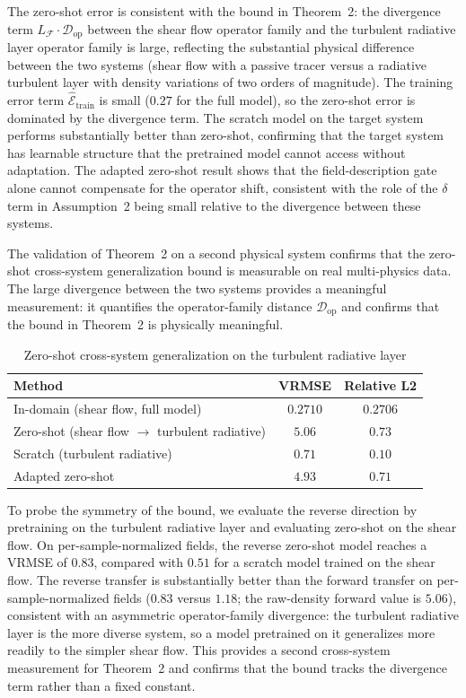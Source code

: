 \documentclass[preprint,12pt]{elsarticle}
\begin{document}
The zero-shot error is consistent with the bound in Theorem~2: the divergence term $L_{\mathcal{F}}\cdot\mathcal{D}_{\mathrm{op}}$ between the shear flow operator family and the turbulent radiative layer operator family is large, reflecting the substantial physical difference between the two systems (shear flow with a passive tracer versus a radiative turbulent layer with density variations of two orders of magnitude). The training error term $\hat{\mathcal{E}}_{\mathrm{train}}$ is small ($0.27$ for the full model), so the zero-shot error is dominated by the divergence term. The scratch model on the target system performs substantially better than zero-shot, confirming that the target system has learnable structure that the pretrained model cannot access without adaptation. The adapted zero-shot result shows that the field-description gate alone cannot compensate for the operator shift, consistent with the role of the $\delta$ term in Assumption~2 being small relative to the divergence between these systems.

The validation of Theorem~2 on a second physical system confirms that the zero-shot cross-system generalization bound is measurable on real multi-physics data. The large divergence between the two systems provides a meaningful measurement: it quantifies the operator-family distance $\mathcal{D}_{\mathrm{op}}$ and confirms that the bound in Theorem~2 is physically meaningful.

\begin{table}[t]
\centering
\small
\caption{Zero-shot cross-system generalization on the turbulent radiative layer}
\label{tab:m3}
\begin{tabular}{lcc}
\toprule
Method & VRMSE & Relative L2 \\
\midrule
In-domain (shear flow, full model) & $0.2710$ & $0.2706$ \\
Zero-shot (shear flow $\to$ turbulent radiative) & $5.06$ & $0.73$ \\
Scratch (turbulent radiative) & $0.71$ & $0.10$ \\
Adapted zero-shot & $4.93$ & $0.71$ \\
\bottomrule
\end{tabular}
\end{table}

To probe the symmetry of the bound, we evaluate the reverse direction by pretraining on the turbulent radiative layer and evaluating zero-shot on the shear flow. On per-sample-normalized fields, the reverse zero-shot model reaches a VRMSE of $0.83$, compared with $0.51$ for a scratch model trained on the shear flow. The reverse transfer is substantially better than the forward transfer on per-sample-normalized fields ($0.83$ versus $1.18$; the raw-density forward value is $5.06$), consistent with an asymmetric operator-family divergence: the turbulent radiative layer is the more diverse system, so a model pretrained on it generalizes more readily to the simpler shear flow. This provides a second cross-system measurement for Theorem~2 and confirms that the bound tracks the divergence term rather than a fixed constant.
\end{document}
